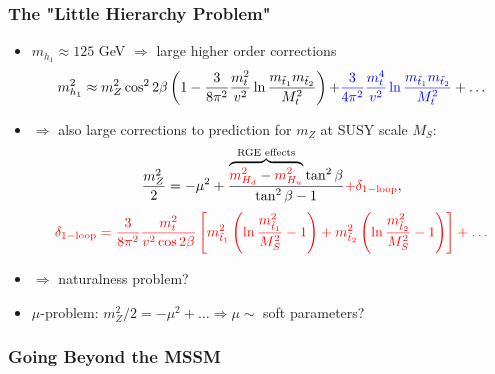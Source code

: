 \documentclass[10pt,aspectratio=169]{beamer}
\begin{document}
\begin{frame}
  \frametitle{The "Little Hierarchy Problem"}
  \begin{itemize}\itemsep1em
    \item $m_{h_1} \approx 125$ GeV $\Rightarrow$ large higher order
      corrections
      \begin{equation*}
        m_{h_1}^2 \approx m_Z^2 \cos^2 2\beta \left ( 1 - \frac{3}{8\pi^2}
          \frac{m_t^2}{v^2} \ln \frac{m_{\tilde{t}_1} m_{\tilde{t}_2}}{M_t^2}
          \right ) {+ \color{blue} \frac{3}{4\pi^2} \frac{m_t^4}{v^2} \ln
          \frac{m_{\tilde{t}_1} m_{\tilde{t}_2}}{M_t^2}} + \ldots
      \end{equation*}
    \item $\Rightarrow$ also large corrections to prediction for $m_Z$
      at SUSY scale $M_S$:
      \begin{equation*}
        \frac{m_Z^2}{2} = -\mu^2 + \frac{\overbrace{{\color{red} m_{H_d}^2} -
          {\color{red} m_{H_u}^2}}^{\text{RGE effects}} \tan^2\beta}
          {\tan^2\beta - 1} {\color{red} +  \delta_{1-\textrm{loop}}} ,
      \end{equation*}
      \begin{equation*}
          {\color{red}
          \delta_{1-\textrm{loop}} = \frac{3}{8\pi^2} \frac{m_t^2}{v^2
            \cos 2\beta} \left [ m_{\tilde{t}_1}^2 \left ( \ln
            \frac{m_{\tilde{t}_1}^2}{M_S^2} - 1 \right ) + m_{\tilde{t}_2}^2
            \left ( \ln \frac{m_{\tilde{t}_2}^2}{M_S^2} - 1 \right ) \right ]
            + \ldots }
      \end{equation*}
    \item $\Rightarrow$ naturalness problem?
    \item \alert{$\mu$-problem}: $m_Z^2/2 = -\mu^2 + \ldots \Rightarrow \mu
      \sim$ soft parameters?
  \end{itemize}
\end{frame}

\begin{frame}
  \frametitle{Going Beyond the MSSM}
\end{frame}
\end{document}
